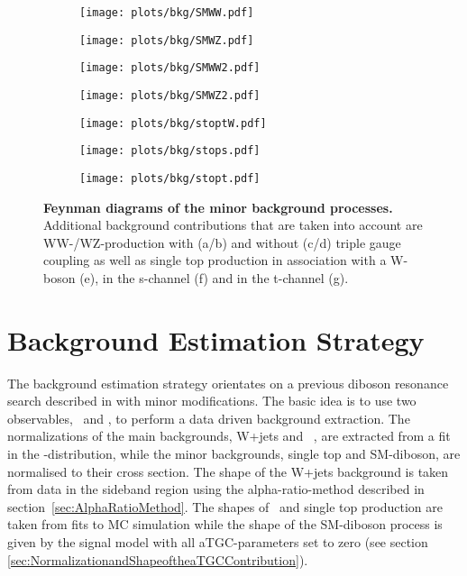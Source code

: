 \begin{figure}
	\centering
	\begin{subfigure}{0.4\textwidth}
		\texttt{[image: plots/bkg/SMWW.pdf]}
		\caption{}
		\label{fig:bkg:fy_WWtgc}
	\end{subfigure}
	\begin{subfigure}{0.4\textwidth}
		\texttt{[image: plots/bkg/SMWZ.pdf]}
		\caption{}
		\label{fig:bkg:fy_WZtgc}
	\end{subfigure}
	\begin{subfigure}{0.4\textwidth}
		\texttt{[image: plots/bkg/SMWW2.pdf]}
		\caption{}
		\label{fig:bkg:fy_WWSM}
	\end{subfigure}
	\begin{subfigure}{0.4\textwidth}
		\texttt{[image: plots/bkg/SMWZ2.pdf]}
		\caption{}
		\label{fig:bkg:fy_WZSM}
	\end{subfigure}
	\begin{subfigure}{0.3\textwidth}
		\texttt{[image: plots/bkg/stoptW.pdf]}
		\caption{}
		\label{fig:bkg:fy_stoptw}
	\end{subfigure}
	\begin{subfigure}{0.4\textwidth}
		\texttt{[image: plots/bkg/stops.pdf]}
		\caption{}
		\label{fig:bkg:fy_stops}
	\end{subfigure}
	\begin{subfigure}{\textwidth}
		\centering
		\texttt{[image: plots/bkg/stopt.pdf]}
		\caption{}
		\label{fig:bkg:fy_stopt}
	\end{subfigure}

	
	\caption[Feynman diagrams of the minor background processes.]{\textbf{Feynman diagrams of the minor background processes.} Additional background contributions that are taken into account are WW-/WZ-production with (a/b) and without (c/d) triple gauge coupling as well as single top production in association with a W-boson (e), in the s-channel (f) and in the t-channel (g).}
\end{figure}

\clearpage
\section{Background Estimation Strategy}
The background estimation strategy orientates on a previous diboson resonance search described in \cite{resonancepas} with minor modifications. The basic idea is to use two observables, \Mpr \ and \MWV, to perform a data driven background extraction. The normalizations of the main backgrounds, W+jets and \ttbar \ , are extracted from a fit in the \Mpr -distribution, while the minor backgrounds, single top and SM-diboson, are normalised to their cross section. The shape of the W+jets background is taken from data in the sideband region using the alpha-ratio-method described in section~\ref{sec:AlphaRatioMethod}. The shapes of \ttbar \ and single top production are taken from fits to MC simulation while the shape of the SM-diboson process is given by the signal model with all aTGC-parameters set to zero (see section \ref{sec:NormalizationandShapeoftheaTGCContribution}).

